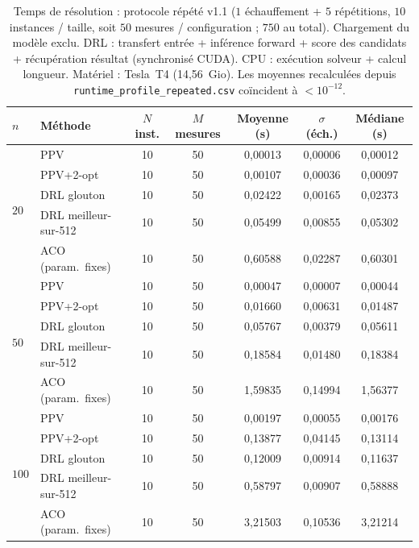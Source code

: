 \documentclass[12pt, a4paper, twoside, openright]{book}
\begin{document}
\begin{table}[H]
\centering
\scriptsize
\begin{tabular}{llccccc}
\toprule
$n$ & Méthode & $N$ inst. & $M$ mesures & Moyenne (s) & $\sigma$ (éch.) & Médiane (s) \\
\midrule
\multirow{5}{*}{$20$}
 & PPV & 10 & 50 & 0,00013 & 0,00006 & 0,00012 \\
 & PPV+2-opt & 10 & 50 & 0,00107 & 0,00036 & 0,00097 \\
 & DRL glouton & 10 & 50 & 0,02422 & 0,00165 & 0,02373 \\
 & DRL meilleur-sur-512 & 10 & 50 & 0,05499 & 0,00855 & 0,05302 \\
 & ACO (param.~fixes) & 10 & 50 & 0,60588 & 0,02287 & 0,60301 \\
\midrule
\multirow{5}{*}{$50$}
 & PPV & 10 & 50 & 0,00047 & 0,00007 & 0,00044 \\
 & PPV+2-opt & 10 & 50 & 0,01660 & 0,00631 & 0,01487 \\
 & DRL glouton & 10 & 50 & 0,05767 & 0,00379 & 0,05611 \\
 & DRL meilleur-sur-512 & 10 & 50 & 0,18584 & 0,01480 & 0,18384 \\
 & ACO (param.~fixes) & 10 & 50 & 1,59835 & 0,14994 & 1,56377 \\
\midrule
\multirow{5}{*}{$100$}
 & PPV & 10 & 50 & 0,00197 & 0,00055 & 0,00176 \\
 & PPV+2-opt & 10 & 50 & 0,13877 & 0,04145 & 0,13114 \\
 & DRL glouton & 10 & 50 & 0,12009 & 0,00914 & 0,11637 \\
 & DRL meilleur-sur-512 & 10 & 50 & 0,58797 & 0,00907 & 0,58888 \\
 & ACO (param.~fixes) & 10 & 50 & 3,21503 & 0,10536 & 3,21214 \\
\bottomrule
\end{tabular}
\caption[Temps de résolution : protocole répété v1.1]{Temps de résolution : protocole répété v1.1 ($1$ échauffement + $5$ répétitions, $10$ instances / taille, soit $50$ mesures / configuration ; $750$ au total). Chargement du modèle exclu. DRL : transfert entrée + inférence forward + score des candidats + récupération résultat (synchronisé CUDA). CPU : exécution solveur + calcul longueur. Matériel : Tesla~T4 (14,56~Gio). Les moyennes recalculées depuis \texttt{runtime\_profile\_repeated.csv} coïncident à $<10^{-12}$.}
\label{tab:temps-v1-1}
\end{table}
\end{document}
